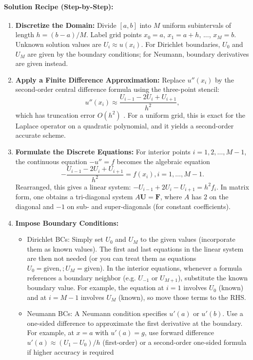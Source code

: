 \documentclass[a4paper,11pt]{article}
\begin{document}
\paragraph{Solution Recipe (Step-by-Step):}
\begin{enumerate}
    \item \textbf{Discretize the Domain:} Divide $[a,b]$ into $M$ uniform subintervals of length $h = (b-a)/M$. Label grid points $x_0 = a$, $x_1 = a+h$, ..., $x_M = b$. Unknown solution values are $U_i \approx u(x_i)$. For Dirichlet boundaries, $U_0$ and $U_M$ are given by the boundary conditions; for Neumann, boundary derivatives are given instead.
    \item \textbf{Apply a Finite Difference Approximation:} Replace $u''(x_i)$ by the second-order central difference formula using the three-point stencil:
          $$u''(x_i) \approx \frac{U_{i-1} - 2U_i + U_{i+1}}{h^2},$$ which has truncation error $O(h^2)$
          \cite{leifh}. For a uniform grid, this is exact for the Laplace operator on a quadratic polynomial, and it yields a second-order accurate scheme.
    \item \textbf{Formulate the Discrete Equations:} For interior points $i=1,2,\dots,M-1$, the continuous equation $-u'' = f$ becomes the algebraic equation
          $$-\frac{U_{i-1} - 2U_i + U_{i+1}}{h^2} = f(x_i), i=1,…,M-1.$$ Rearranged, this gives a linear system: $-U_{i-1} + 2U_i - U_{i+1} = h^2 f_i$. In matrix form, one obtains a tri-diagonal system $A\mathbf{U} = \mathbf{F}$, where $A$ has $2$ on the diagonal and $-1$ on sub- and super-diagonals (for constant coefficients).
    \item \textbf{Impose Boundary Conditions:}
          \begin{itemize}
              \item Dirichlet BCs: Simply set $U_0$ and $U_M$ to the given values (incorporate them as known values). The first and last equations in the linear system are then not needed (or you can treat them as equations
                    $U_0 = \text{given},; U_M = \text{given}$). In the interior equations, whenever a formula references a boundary neighbor (e.g. $U_{-1}$ or $U_{M+1}$), substitute the known boundary value. For example, the equation at $i=1$ involves $U_0$ (known) and at $i=M-1$ involves $U_M$ (known), so move those terms to the RHS.
              \item Neumann BCs: A Neumann condition specifies $u'(a)$ or $u'(b)$. Use a one-sided difference to approximate the first derivative at the boundary. For example, at $x=a$ with $u'(a)=g$, use forward difference $u'(a)\approx (U_1 - U_0)/h$ (first-order) or a second-order one-sided formula if higher accuracy is required

\end{itemize}
\end{enumerate}
\end{document}
